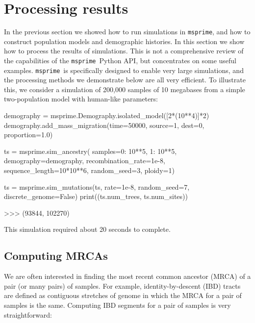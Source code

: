 \documentclass[graybox]{svmult}
\newcommand{\msprime}[0]{\texttt{msprime}}
\begin{document}

\section{Processing results}\label{processing-results}

In the previous section we showed how to run simulations in \msprime, and
how to construct population models and demographic histories. In this
section we show how to process the results of simulations. This is not a
comprehensive review of the capabilities of the \msprime\ Python API, but
concentrates on some useful examples.
\msprime\ is specifically designed to enable very large simulations, and
the processing methods we demonstrate below are all very efficient. To
illustrate this, we consider a simulation of 200,000 samples of 10 megabases
from a simple two-population model with human-like parameters:

\begin{pythoncode}
demography = msprime.Demography.isolated_model([2*(10**4)]*2)
demography.add_mass_migration(time=50000, source=1, dest=0, proportion=1.0)

ts = msprime.sim_ancestry(
    samples={0: 10**5, 1: 10**5},
    demography=demography, recombination_rate=1e-8,
    sequence_length=10*10**6, random_seed=3,
    ploidy=1)

ts = msprime.sim_mutations(ts, rate=1e-8, random_seed=7, discrete_genome=False)
print((ts.num_trees, ts.num_sites))

>>> (93844, 102270)
\end{pythoncode}

This simulation required about 20 seconds to complete.


\subsection{Computing MRCAs}\label{computing-mrcas}

We are often interested in finding the most recent common ancestor (MRCA)
of a pair (or many pairs) of samples. For example, identity-by-descent
(IBD) tracts are defined as contiguous stretches of genome in which the
MRCA for a pair of samples is the same. Computing IBD segments for a
pair of samples is very straightforward:
\end{document}

